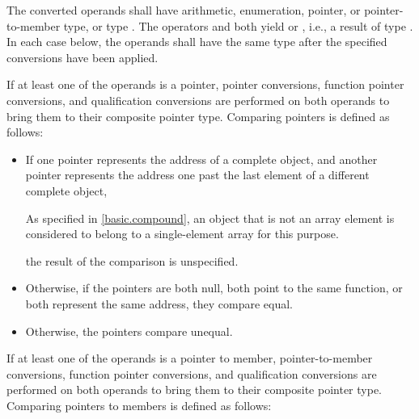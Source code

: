\pnum
The converted operands shall have arithmetic, enumeration, pointer,
or pointer-to-member type, or type . The operators
\tcode{==} and \tcode{!=} both yield  or , i.e., a
result of type . In each case below, the operands shall have the
same type after the specified conversions have been applied.

\pnum
{}%
%
If at least one of the operands is a pointer,
pointer conversions,
function pointer conversions, and
qualification conversions
are performed on both operands to bring them to their composite pointer type.
Comparing pointers is defined as follows:

\begin{itemize}
\item
If one pointer represents the address of a complete object, and another
pointer represents the address one past the last element of a different
complete object,
\begin{footnote}
As specified in \ref{basic.compound},
an object that is not an array element is
considered to belong to a single-element array for this purpose.
\end{footnote}
the result of the comparison is unspecified.
\item
Otherwise, if the pointers are both null, both point to the same
%
function, or both represent the same address,
they compare equal.
\item
Otherwise, the pointers compare unequal.
\end{itemize}

\pnum
If at least one of the operands is a pointer to member,
pointer-to-member conversions,
function pointer conversions, and
qualification conversions
are performed on both operands to bring them to
their composite pointer type.
Comparing pointers to members is defined as follows:

